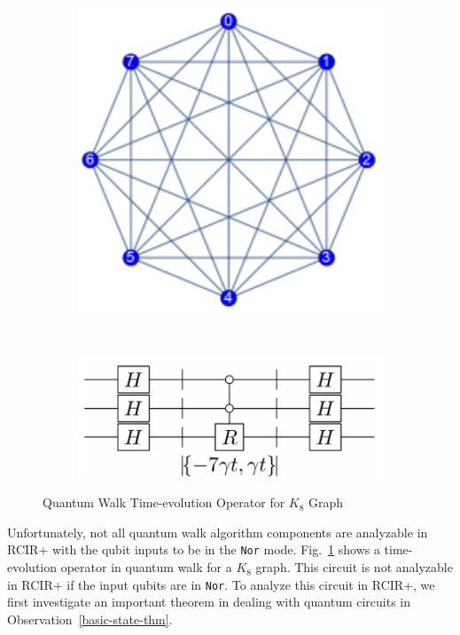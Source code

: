 \begin{figure}[h]
\centering
     \begin{subfigure}[h]{0.25\textwidth}
         \centering
         \includegraphics[width=1\textwidth]{k-graph.png}
     \end{subfigure}%
     ~
     \begin{subfigure}[h]{0.5\textwidth}
         \centering
         \includegraphics[width=1\textwidth]{tim-evolve-k-graph.png}
     \end{subfigure}
\caption{Quantum Walk Time-evolution Operator for $K_8$ Graph}
\label{fig:quantum-walk-time-evol}
\end{figure}

Unfortunately, not all quantum walk algorithm components are analyzable in RCIR+ with the qubit inputs to be in the \texttt{Nor} mode. 
Fig.~\ref{fig:quantum-walk-time-evol} shows a time-evolution operator in quantum walk for a $K_8$ graph.
This circuit is not analyzable in RCIR+ if the input qubits are in \texttt{Nor}.
To analyze this circuit in RCIR+, we first investigate an important theorem in dealing with quantum circuits in Observation~\ref{basic-state-thm}. 

